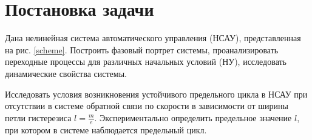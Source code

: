 


	
	
	\setcounter{page}{2}
	\tableofcontents
	\newpage
	
	\section{Постановка задачи}
	
	Дана нелинейная система автоматического управления (НСАУ), представленная на рис. \ref{scheme}. Построить фазовый портрет системы, проанализировать переходные процессы для различных начальных условий (НУ), исследовать динамические свойства системы.
	
	Исследовать условия возникновения устойчивого предельного цикла в НСАУ при отсутствии в системе обратной связи по скорости в зависимости от ширины петли гистерезиса $l = \frac{m}{e}$. Экспериментально определить предельное значение $l$, при котором в системе наблюдается предельный цикл.
	
		
	


